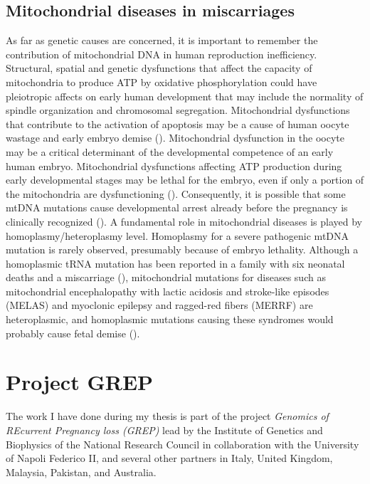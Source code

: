 \subsection{Mitochondrial diseases in miscarriages}

As far as genetic causes are concerned, it is important to remember the contribution of mitochondrial DNA in human reproduction inefficiency. 
Structural, spatial and genetic dysfunctions that affect the capacity of mitochondria to produce ATP by oxidative phosphorylation could have pleiotropic affects on early human development that may include the normality of spindle organization and chromosomal segregation. Mitochondrial dysfunctions that contribute to the activation of apoptosis may be a cause of human oocyte wastage and early embryo demise (\cite{van2004mitochondria}).
Mitochondrial dysfunction in the oocyte may be a critical determinant of the developmental competence of an early human embryo. Mitochondrial dysfunctions affecting ATP production during early developmental stages may be lethal for the embryo, even if only a portion of the mitochondria are dysfunctioning (\cite{karaa2019effects ,kaare2009mitochondrial}). Consequently, it is possible that some mtDNA mutations cause developmental arrest already before the pregnancy is clinically recognized (\cite{van2004mitochondria}). A fundamental role in mitochondrial diseases is played by homoplasmy/heteroplasmy level.
Homoplasmy for a severe pathogenic mtDNA mutation is rarely observed, presumably because of embryo lethality. 
Although a homoplasmic tRNA mutation has been reported in a family with six neonatal deaths and a miscarriage (\cite{mcfarland2002multiple}), mitochondrial mutations for diseases such as mitochondrial encephalopathy with lactic acidosis and stroke-like episodes (MELAS) and myoclonic epilepsy and ragged-red fibers (MERRF) are heteroplasmic, and homoplasmic mutations causing these syndromes would probably cause fetal demise (\cite{van2004mitochondria}).


\section{Project GREP}
The work I have done during my thesis is part of the project \textit{Genomics of REcurrent Pregnancy loss (GREP)} lead by the Institute of Genetics and Biophysics of the National Research Council in collaboration with the University of Napoli Federico II, and several other partners in Italy, United Kingdom, Malaysia, Pakistan, and Australia.  

